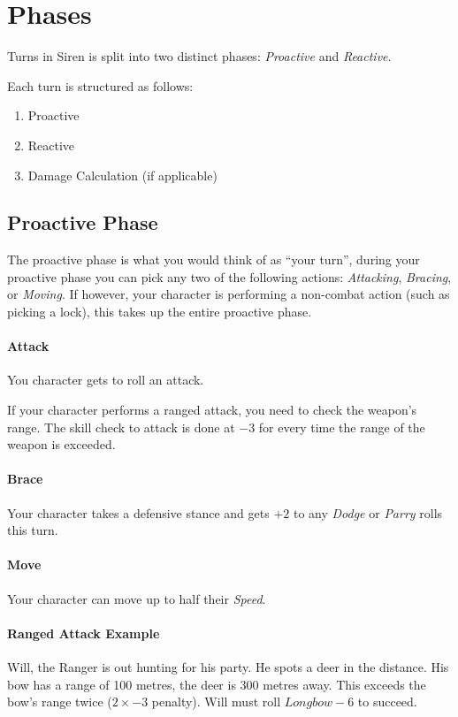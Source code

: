 \section{Phases}\label{sec:phases}
Turns in Siren is split into two distinct phases: \textit{Proactive} and \textit{Reactive}.

Each turn is structured as follows:
\begin{enumerate}
  \item Proactive 
  \item Reactive
  \item Damage Calculation (if applicable)
\end{enumerate}

\subsection{Proactive Phase}
The proactive phase is what you would think of as ``your turn'', during your proactive phase you can pick any two of the following actions: \textit{Attacking}, \textit{Bracing}, or \textit{Moving}.
If however, your character is performing a non-combat action (such as picking a lock), this takes up the entire proactive phase.

\paragraph{Attack}
You character gets to roll an attack.

If your character performs a ranged attack, you need to check the weapon's range.
The skill check to attack is done at $-3$ for every time the range of the weapon is exceeded.

\paragraph{Brace}
Your character takes a defensive stance and gets $+2$ to any \textit{Dodge} or \textit{Parry} rolls this turn.

\paragraph{Move}
Your character can move up to half their \textit{Speed}.

\paragraph{Ranged Attack Example} Will, the Ranger is out hunting for his party. 
He spots a deer in the distance. 
His bow has a range of 100 metres, the deer is 300 metres away. 
This exceeds the bow's range twice ($2\times -3$ penalty). 
Will must roll $Longbow-6$ to succeed.

